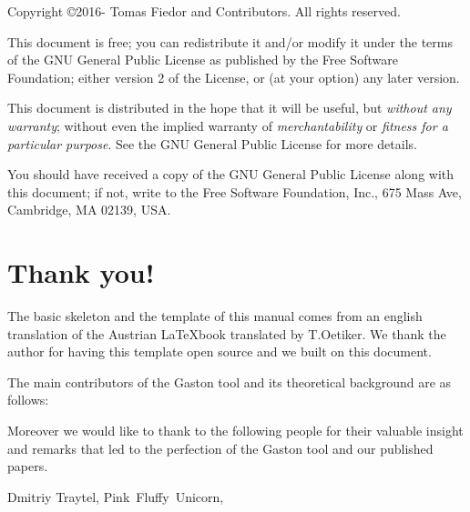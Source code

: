 \begin{small} 
  \noindent Copyright \copyright 2016- Tomas Fiedor and Contributors.  All rights reserved.
 
  This document is free; you can redistribute it and/or modify it
  under the terms of the GNU General Public License as published by
  the Free Software Foundation; either version 2 of the License, or
  (at your option) any later version.
  
  This document is distributed in the hope that it will be useful, but
  \emph{without any warranty}; without even the implied warranty of
  \emph{merchantability} or \emph{fitness for a particular purpose}\@.  See the GNU
  General Public License for more details.
  
  You should have received a copy of the GNU General Public License
  along with this document; if not, write to the Free Software
  Foundation, Inc., 675 Mass Ave, Cambridge, MA 02139, USA.

\end{small}

\chapter{Thank you!}
\noindent The basic skeleton and the template of this manual comes from an english translation of the Austrian \LaTeX book translated by T.Oetiker. We thank the author for having this template open source and we built on this document.

The main contributors of the Gaston tool and its theoretical background are as follows:
\begin{verse}
\end{verse}

Moreover we would like to thank to the following people for their valuable insight and remarks that led to the perfection of the
Gaston tool and our published papers.

{\flushleft\small
Dmitriy Traytel,			%
Pink~Fluffy~Unicorn,        %
}




\pagebreak
\endinput
%

